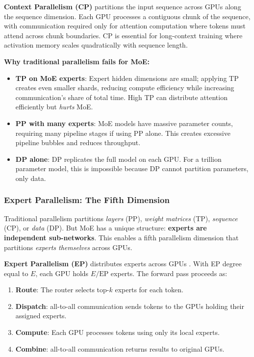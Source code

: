 \documentclass[10pt,logo,copyright]{nvidiatechreport}
\begin{document}
\textbf{Context Parallelism (CP)} \cite{korthikanti2023sequence,liu2023ringattention,jacobs2023deepspeedulysses} partitions the input sequence across GPUs along the sequence dimension. Each GPU processes a contiguous chunk of the sequence, with communication required only for attention computation where tokens must attend across chunk boundaries. CP is essential for long-context training where activation memory scales quadratically with sequence length.

\textbf{Why traditional parallelism fails for MoE:}

\begin{itemize}
    \item \textbf{TP on MoE experts}: Expert hidden dimensions are small; applying TP creates even smaller shards, reducing compute efficiency while increasing communication's share of total time. High TP can distribute attention efficiently but \emph{hurts} MoE.
    \item \textbf{PP with many experts}: MoE models have massive parameter counts, requiring many pipeline stages if using PP alone. This creates excessive pipeline bubbles and reduces throughput.
    \item \textbf{DP alone}: DP replicates the full model on each GPU. For a trillion parameter model, this is impossible because DP cannot partition parameters, only data.
\end{itemize}

\subsubsection{Expert Parallelism: The Fifth Dimension}\label{sec:expert-parallelism}

Traditional parallelism partitions \emph{layers} (PP), \emph{weight matrices} (TP), \emph{sequence} (CP), or \emph{data} (DP). But MoE has a unique structure: \textbf{experts are independent sub-networks}. This enables a fifth parallelism dimension that partitions \emph{experts themselves} across GPUs.

\textbf{Expert Parallelism (EP)} distributes experts across GPUs \cite{lepikhin2020gshard}. With EP degree equal to $E$, each GPU holds $E/\text{EP}$ experts. The forward pass proceeds as:

\begin{enumerate}
    \item \textbf{Route}: The router selects top-$k$ experts for each token.
    \item \textbf{Dispatch}: all-to-all communication sends tokens to the GPUs holding their assigned experts.
    \item \textbf{Compute}: Each GPU processes tokens using only its local experts.
    \item \textbf{Combine}: all-to-all communication returns results to original GPUs.
\end{enumerate}
\end{document}
